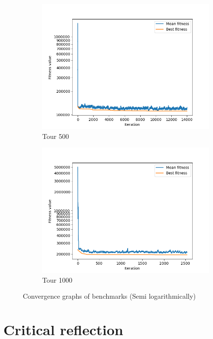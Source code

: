 \documentclass[a4paper,10pt]{article}
\begin{document}
\begin{figure}[H]
\begin{subfigure}[b]{0.40\linewidth}
          \includegraphics[width=\linewidth]{tour_500_28_12_2021_20_20.png}
      \caption{Tour 500}
      \label{fig:tour_500}
    \end{subfigure}
    \begin{subfigure}[b]{0.40\linewidth}
          \includegraphics[width=\linewidth]{tour_1000_28_12_2021_20_40.png}
      \caption{Tour 1000}
      \label{fig:tour_1000}
    \end{subfigure}
    \caption{Convergence graphs of benchmarks (Semi logarithmically)}
    \label{fig:convergence_graphs}
  \end{figure}

\section{Critical reflection}
\end{document}

